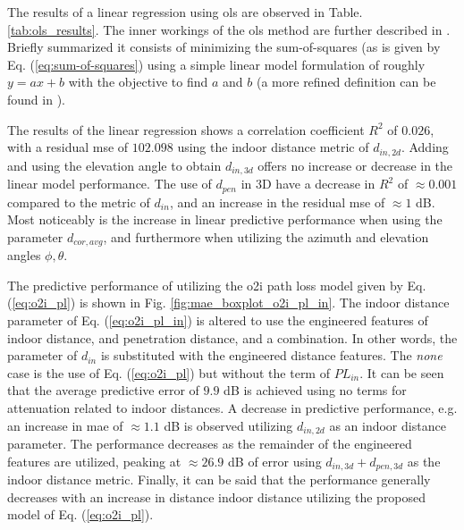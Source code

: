 The results of a linear regression using \gls{ols} are observed in Table. \ref{tab:ols_results}. The inner workings of the \gls{ols} method are further described in \cite{seabold2010statsmodels}. Briefly summarized it consists of minimizing the sum-of-squares (as is given by Eq. (\ref{eq:sum-of-squares}) using a simple linear model formulation of roughly $y=ax+b$ with the objective to find $a$ and $b$ (a more refined definition can be found in \cite{M.Bishop2006}). 

The results of the linear regression shows a correlation coefficient $R^2$ of $0.026$, with a residual \gls{mse} of $102.098$ using the indoor distance metric of $d_{in,2d}$. Adding and using the elevation angle to obtain $d_{in,3d}$ offers no increase or decrease in the linear model performance. The use of $d_{pen}$ in $3$D have a decrease in  $R^2$ of $\approx 0.001$ compared to the metric of $d_{in}$, and an increase in the residual \gls{mse} of $\approx 1$ dB. Most noticeably is the increase in linear predictive performance when using the parameter $d_{cor,avg}$, and furthermore when utilizing the azimuth and elevation angles $\phi, \theta$.


The predictive performance of utilizing the \gls{o2i} path loss model given by Eq. (\ref{eq:o2i_pl}) is shown in Fig. \ref{fig:mae_boxplot_o2i_pl_in}. The indoor distance parameter of Eq. (\ref{eq:o2i_pl_in}) is altered to use the engineered features of indoor distance, and penetration distance, and a combination. In other words, the parameter of $d_{in}$ is substituted with the engineered distance features. The \emph{none} case is the use of Eq. (\ref{eq:o2i_pl}) but without the term of $PL_{in}$. It can be seen that the average predictive error of $9.9$ dB is achieved using no terms for attenuation related to indoor distances. A decrease in predictive performance, e.g. an increase in \gls{mae} of $\approx 1.1$ dB is observed utilizing $d_{in,2d}$ as an indoor distance parameter. The performance decreases as the remainder of the engineered features are utilized, peaking at $\approx 26.9$ dB of error using $d_{in,3d}+d_{pen,3d}$ as the indoor distance metric. Finally, it can be said that the performance generally decreases with an increase in distance indoor distance utilizing the proposed model of Eq. (\ref{eq:o2i_pl}).

